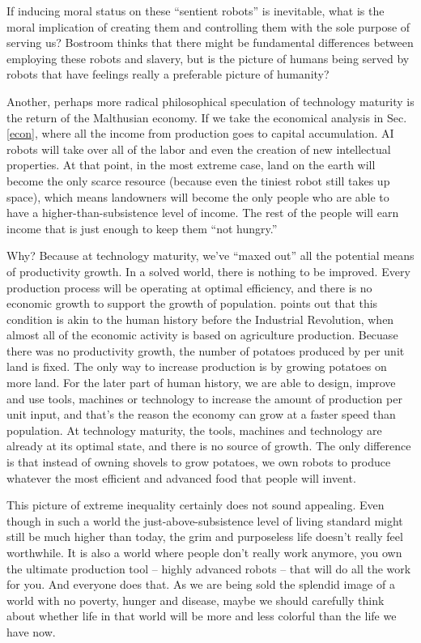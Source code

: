 \documentclass[12pt]{article}
\begin{document}
If inducing moral status on these ``sentient robots'' is inevitable, what is the moral implication of creating them and controlling them with the sole purpose of serving us? Bostroom thinks that there might be fundamental differences between employing these robots and slavery, but is the picture of humans being served by robots that have feelings really a preferable picture of humanity?

Another, perhaps more radical philosophical speculation of technology maturity is the return of the Malthusian economy. If we take the economical analysis in Sec. \ref{econ}, where all the income from production goes to capital accumulation. AI robots will take over all of the labor and even the creation of new intellectual properties. At that point, in the most extreme case, land on the earth will become the only scarce resource (because even the tiniest robot still takes up space), which means landowners will become the only people who are able to have a higher-than-subsistence level of income. The rest of the people will earn income that is just enough to keep them ``not hungry.''

Why? Because at technology maturity, we've ``maxed out'' all the potential means of productivity growth. In a solved world, there is nothing to be improved. Every production process will be operating at optimal efficiency, and there is no economic growth to support the growth of population. \cite{bostromdeeputopia} points out that this condition is akin to the human history before the Industrial Revolution, when almost all of the economic activity is based on agriculture production. Becuase there was no productivity growth, the number of potatoes produced by per unit land is fixed. The only way to increase production is by growing potatoes on more land. For the later part of human history, we are able to design, improve and use tools, machines or technology to increase the amount of production per unit input, and that's the reason the economy can grow at a faster speed than population. At technology maturity, the tools, machines and technology are already at its optimal state, and there is no source of growth. The only difference is that instead of owning shovels to grow potatoes, we own robots to produce whatever the most efficient and advanced food that people will invent.

This picture of extreme inequality certainly does not sound appealing. Even though in such a world the just-above-subsistence level of living standard might still be much higher than today, the grim and purposeless life doesn't really feel worthwhile. It is also a world where people don't really work anymore, you own the ultimate production tool -- highly advanced robots -- that will do all the work for you. And everyone does that. As we are being sold the splendid image of a world with no poverty, hunger and disease, maybe we should carefully think about whether life in that world will be more and less colorful than the life we have now.
\end{document}
